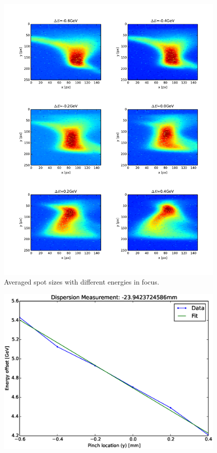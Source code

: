 \documentclass[aps,prl,twocolumn,groupedaddress]{revtex4}
\begin{document}
\begin{figure}
\includegraphics[scale=0.4,page=1]{output.pdf}
\caption{Averaged spot sizes with different energies in focus.}
\end{figure}
\begin{figure}
\includegraphics[scale=0.4]{dispersionfrompinch.eps}
\end{figure}
\end{document}
